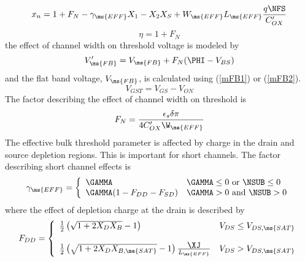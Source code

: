 {\begin{equation}
x_n      = 1 + F_N -\gamma_{\ms{EFF}}X_1 -X_2X_S
   + W_{\ms{EFF}}L_{\ms{EFF}} {{q \NFS} \over {C'_{OX}}}
\end{equation}
\begin{equation}
\eta = 1 + F_N
\end{equation}
the effect of channel width on threshold voltage is modeled by
\begin{equation}
V'_{\ms{FB}}= V_{\ms{FB}} + F_N(\PHI -V_{BS}) \label{eqn:vdashfb}
\end{equation}
and the flat band voltage, $V_{\ms{FB}}$, is calculated using
(\ref{mFB1}) or (\ref{mFB2}).
\begin{equation}
V_{GST} = V_{GS} - V_{ON}
\end{equation}
The factor describing the effect of channel width on threshold is
\begin{equation}
F_N={{\textstyle\epsilon_s\delta\pi} \over {\textstyle 4 C'_{OX}
\W_{\ms{EFF}} }}
\end{equation}
The effective bulk threshold parameter is affected by charge in
the drain and source depletion regions.  This is important for
short channels. The factor describing short channel effects is
\begin{equation}
\gamma_{\ms{EFF}} = \left\{ \begin{array}{ll}
     \GAMMA               & \GAMMA \le 0 \mbox{ or } \NSUB \le 0\\
     \GAMMA(1-F_{DD}-F_{SD}) & \GAMMA > 0 \mbox{ and } \NSUB > 0
     \end{array} \right. %
\end{equation}
where the effect of depletion charge at the drain is described by
\begin{equation}
F_{DD} = \left\{ \begin{array}{ll}
         \frac{1}{2}\left( \sqrt{1+2X_DX_B}-1\right)
         & V_{DS} \le V_{DS,\ms{SAT}} \\ \\
         \frac{1}{2}\left( \sqrt{1+2X_DX_{B,\ms{SAT}}}-1\right)
         {{\textstyle\XJ}\over{L_{\ms{EFF}}}}
         & V_{DS} > V_{DS,\ms{SAT}} \\
         \end{array} \right. %
\end{equation}

}
